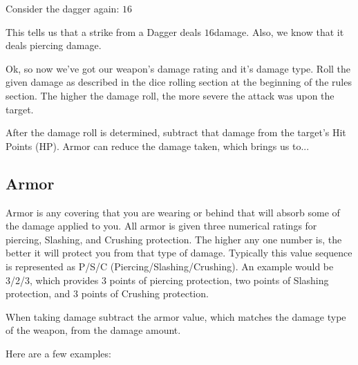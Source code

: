 \documentclass[twoside]{book}
\begin{document}
    {  
     Consider the dagger again: \ensuremath{1}\ensuremath{6}\ensuremath{} 
    }
  
    {  
     This tells us that a strike from a Dagger deals \ensuremath{1}\ensuremath{6}\ensuremath{}damage. Also, we know that it deals piercing damage.
               
    }
  
    {  
     Ok, so now we've got our weapon's damage
               rating and it's damage type. Roll the given damage
               as described in the dice rolling section at the beginning
               of the rules section. The higher the damage roll, the more
               severe the attack was upon the target. 
    }
  
    {  
     After the damage roll is determined, subtract that
               damage from the target's Hit Points (HP). Armor can
               reduce the damage taken, which brings us to...
               
    }
  
    

\subsection{Armor}
    
    {  
     Armor is any covering that you are wearing or behind
               that will absorb some of the damage applied to you. All
               armor is given three numerical ratings for piercing,
               Slashing, and Crushing protection. The higher any one
               number is, the better it will protect you from that type
               of damage. Typically this value sequence is represented as
               P/S/C (Piercing/Slashing/Crushing). An example would be
               3/2/3, which provides 3 points of piercing protection, two
               points of Slashing protection, and 3 points of Crushing
               protection. 
    }
  
    {  
     When taking damage subtract the armor value, which
               matches the damage type of the weapon, from the damage
               amount. 
    }
  
    {  
     Here are a few examples: 
    }
  
  
\end{document}
